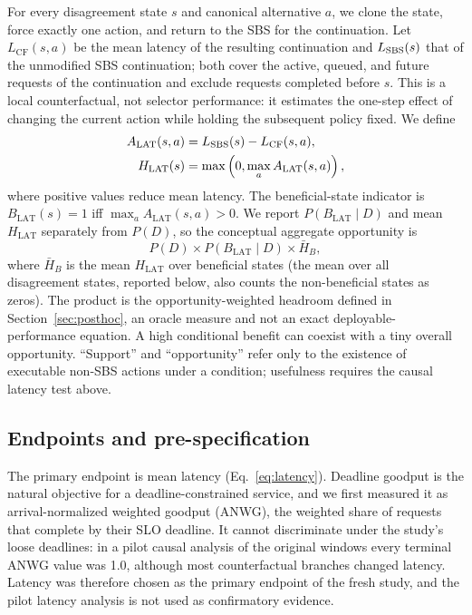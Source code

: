 \documentclass[preprint,12pt]{elsarticle}
\begin{document}
For every disagreement state $s$ and canonical alternative $a$, we clone the
state, force exactly one action, and return to the SBS for the continuation.
Let $L_{\mathrm{CF}}(s,a)$ be the mean latency of the resulting continuation and
$L_{\mathrm{SBS}}(s)$ that of the unmodified SBS continuation; both cover the active,
queued, and future requests of the continuation and exclude requests completed
before $s$. This is a local counterfactual, not selector performance: it
estimates the one-step effect of changing the current action while holding the
subsequent policy fixed. We define
\begin{equation}
 \begin{aligned}
 A_{\mathrm{LAT}}(s,a)&=L_{\mathrm{SBS}}(s)-L_{\mathrm{CF}}(s,a),\\
 H_{\mathrm{LAT}}(s)&=\max\left(0,\max_aA_{\mathrm{LAT}}(s,a)\right),
 \end{aligned}
 \label{eq:latency}
\end{equation}
where positive values reduce mean latency. The beneficial-state indicator is
$B_{\mathrm{LAT}}(s)=1$ iff $\max_aA_{\mathrm{LAT}}(s,a)>0$. We report
$P(B_{\mathrm{LAT}}\mid D)$ and mean $H_{\mathrm{LAT}}$ separately from $P(D)$,
so the conceptual aggregate opportunity is
\begin{equation}
 P(D)\times P(B_{\mathrm{LAT}}\mid D)\times\bar H_{B},
 \label{eq:decomposition}
\end{equation}
where $\bar H_{B}$ is the mean $H_{\mathrm{LAT}}$ over beneficial states (the mean
over all disagreement states, reported below, also counts the non-beneficial
states as zeros). The product is the opportunity-weighted headroom defined in
Section~\ref{sec:posthoc}, an oracle measure and not an exact
deployable-performance equation. A high conditional benefit can
coexist with a tiny overall opportunity. ``Support'' and ``opportunity'' refer
only to the existence of executable non-SBS actions under a condition;
usefulness requires the causal latency test above.

\subsection{Endpoints and pre-specification}
\label{sec:endpoint}
The primary endpoint is mean latency (Eq.~\ref{eq:latency}). Deadline goodput is
the natural objective for a deadline-constrained service, and we first measured
it as arrival-normalized weighted goodput (ANWG), the weighted share of requests
that complete by their SLO deadline. It cannot discriminate under the study's
loose deadlines: in a pilot causal analysis of the original windows every
terminal ANWG value was 1.0, although most counterfactual branches changed
latency. Latency was therefore chosen as the primary endpoint of the fresh
study, and the pilot latency analysis is not used as confirmatory evidence.
\end{document}
